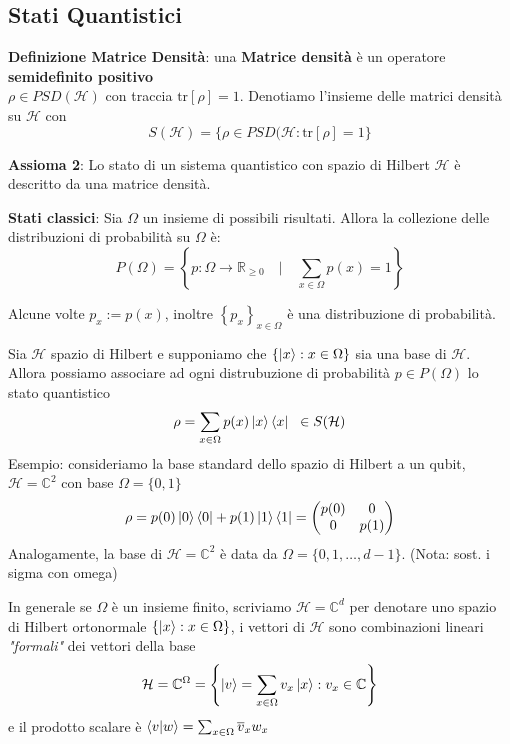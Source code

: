 \documentclass{report}
\begin{document}
\subsection{Stati Quantistici}
\textbf{Definizione Matrice Densità}: una \textbf{Matrice densità} è un operatore \textbf{semidefinito positivo}\\ $\rho \in \textit{PSD}(\mathcal{H})$ con traccia $\text{tr}[\rho]=1$.
Denotiamo l'insieme delle matrici densità su $\mathcal{H}$ con $$S(\mathcal{H})=\{\rho \in\textit{PSD}(\mathcal{H}:\text{tr}[\rho]=1\}$$

\textbf{Assioma 2}: Lo stato di un sistema quantistico con spazio di Hilbert $\mathcal{H}$ è descritto da una matrice densità.

\textbf{Stati classici}: Sia $\Omega$ un insieme di possibili risultati. Allora la collezione delle distribuzioni di probabilità su $\Omega$ è: $$P(\Omega)=\left\{p : \Omega\rightarrow\mathbb{R}_{\ge0}\quad|\quad\sum_{x \in \Omega}p(x)=1\right\}$$

Alcune volte $p_x:= p(x)$, inoltre $\left\{p_x \right\}_{x\in \Omega}$ è una distribuzione di probabilità.

Sia $\mathcal{H}$ spazio di Hilbert e supponiamo che $\left\{ \ket{x}:x \in \Omega \right\}$ sia una base di $\mathcal{H}$.
Allora possiamo associare ad ogni distrubuzione di probabilità $p \in P(\Omega)$ lo stato quantistico
$$\rho  = \sum_{x \in \Omega} p(x)\ket{x}\bra{x} \hspace{0.2cm} \in S(\mathcal{H})$$
Esempio: consideriamo la base standard dello spazio di Hilbert a un qubit, $\mathcal{H}= \mathbb{C}^2$ con base $\Omega = \{0,1\}$
$$\rho = p(0) \ket{0}\bra{0}+p(1) \ket{1}\bra{1}=
\begin{pmatrix}
    p(0) & 0\\
    0 & p(1) \\
\end{pmatrix}
$$
Analogamente, la base di $\mathcal{H} = \mathbb{C}^2$ è data da $\Omega = \{0,1,\dots,d-1\}$. (Nota: sost. i sigma con omega)

In generale se $\Omega$ è un insieme finito, scriviamo $\mathcal{H}= \mathbb{C}^d$ per denotare uno spazio di Hilbert ortonormale $\left\{ \ket{x}:x \in \Omega  \right\}$, i vettori di $\mathcal{H}$ sono combinazioni lineari \textit{"formali"} dei vettori della base
$$\mathcal{H} = \mathbb{C}^\Omega = \left\{ \ket{v} = \sum_{x\in \Omega} v_x \ket{x}:v_x \in \mathbb{C}\right\}$$
e il prodotto scalare è $\braket{v|w}=\sum_{x\in \Omega} \overline{v}_x w_x$
\end{document}
